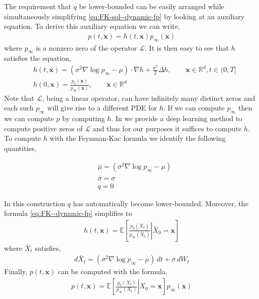 The requirement that $q$ be lower-bounded can be easily arranged while simultaneously simplifying \eqref{eq:FK-sol--dynamic-fp} by looking at an auxiliary equation. To derive this auxiliary equation we can write, 
\begin{align}
    p(t, \mathbf x) = h(t, \mathbf x)p_\infty(\mathbf x)
\end{align}
where $p_\infty$ is a nonzero zero of the operator $\mathcal L$. It is then easy to see that $h$ satisfies the equation, 
\begin{equation}
\begin{aligned}
    &h(t, \mathbf x) = (\sigma^2\nabla\log p_\infty - \mu)\cdot \nabla h + \frac{\sigma^2}{2}\Delta h,\qquad \mathbf x\in \mathbb R^d, t\in(0, T]\\
    &h(0, \mathbf x) = \frac{p_0(\mathbf x)}{p_\infty(\mathbf x)},\qquad \mathbf x\in \mathbb R^d
\end{aligned}\label{eq:h--dynamic-fp}
\end{equation}
Note that $\mathcal L$, being a linear operator, can have infinitely many distinct zeros and each such $p_\infty$ will give rise to a different PDE for $h$. If we can compute $p_\infty$ then we can compute $p$ by computing $h$. In \cite{mandal2023learning} we provide a deep learning method to compute positive zeros of $\mathcal L$ and thus for our purposes it suffices to compute $h$. To compute $h$ with the Feynman-Kac formula we identify the following quantities, 

\begin{equation}
\begin{aligned}
    &\bar\mu = (\sigma^2\nabla\log p_\infty - \mu)\\
    &\bar\sigma =\sigma\\
    & q = 0
\end{aligned}
\end{equation}

In this construction $q$ has automatically become lower-bounded. Moreover, the formula \eqref{eq:FK--dynamic-fp} simplifies to 
\begin{align}
    h(t, \mathbf x) = \mathbb E\left[\left.\frac{p_0(\bar X_t)}{p_\infty(\bar X_t)}\right\vert \bar X_0=\mathbf x\right]\label{eq:h-E--dynamic-fp}
\end{align}
where $\bar X_t$ satisfies, 
\begin{align}
    d\bar X_t = (\sigma^2\nabla\log p_\infty-\mu)\,dt + \sigma\,dW_t\label{eq:h-SDE--dynamic-fp}
\end{align}
Finally, $p(t,\mathbf x)$ can be computed with the formula, 
\begin{align}
    p(t, \mathbf x) = \mathbb E\left[\left.\frac{p_0(X_t)}{p_\infty(X_t)}\right\vert X_0=\mathbf x\right]p_\infty(\mathbf x)\label{eq:p-E--dynamic-fp}
\end{align}

